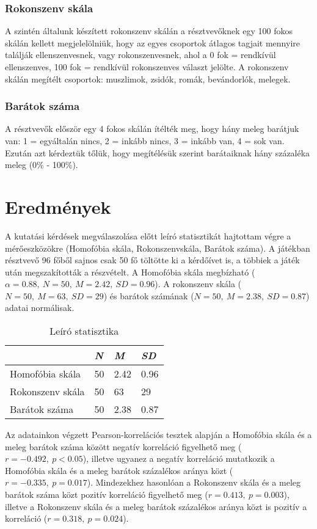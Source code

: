 \subsubsection{Rokonszenv skála}
A  szintén általunk készített rokonszenv skálán a résztvevőknek egy 100 fokos skálán kellett megjelelölniük, hogy az egyes csoportok átlagos tagjait mennyire találják ellenszenvesnek, vagy rokonszenvesnek, ahol a 0 fok = rendkívül ellenszenves, 100 fok = rendkívül rokonszenves választ jelölte. A rokonszenv skálán megítélt csoportok: muszlimok, zsidók, romák, bevándorlók, melegek.

\subsubsection{Barátok száma}
A résztvevők először egy 4 fokos skálán ítélték meg, hogy hány meleg barátjuk van: 1 = egyáltalán nincs, 2 = inkább nincs, 3 = inkább van, 4 = sok van. Ezután azt kérdeztük tőlük, hogy megítélésük szerint barátaiknak hány százaléka meleg (0\% - 100\%).

\pagebreak
\section{Eredmények}
A kutatási kérdések megválaszolása előtt leíró statisztikát hajtottam végre a mérőeszközökre (Homofóbia skála, Rokonszenvskála, Barátok száma). A játékban résztvevő 96 főből sajnos csak 50 fő töltötte ki a kérdőívet is, a többiek a játék után megszakították a részvételt. A Homofóbia skála megbízható ($\alpha=0.88,\  N=50, \  M=2.42, \ SD=0.96$). A rokonszenv skála ($N=50,\  M=63,\  SD=29$) és barátok számának ($N=50, \ M=2.38, \ SD=0.87$) adatai normálisak. 

\begin{table}[h]
	\centering
	\begin{tabular}{|l|l|l|l|}
		\hline
		& \textit{N}  & \textit{M}    & \textit{SD}   \\ \hline
		Homofóbia skála  & 50 & 2.42 & 0.96 \\ \hline
		Rokonszenv skála & 50 & 63   & 29   \\ \hline
		Barátok száma    & 50 & 2.38 & 0.87 \\ \hline
	\end{tabular}
	\caption{Leíró statisztika}
	\label{table:1}
\end{table}

Az adatainkon végzett Pearson-korrelációs tesztek alapján a Homofóbia skála és a meleg barátok száma között negatív korreláció figyelhető meg ($r= -0.492, \  p<0.05$), illetve ugyanez a negatív korreláció mutatkozik a Homofóbia skála és a meleg barátok százalékos aránya közt ($r= -0.335, \  p=0.017$). Mindezekhez hasonlóan a Rokonszenv skála és a meleg barátok száma közt pozitív korreláció figyelhető meg ($r= 0.413, \  p=0.003$), illetve a Rokonszenv skála és a meleg barátok százalékos aránya közt is pozitív a korreláció ($r=0.318, \  p=0.024$). 

